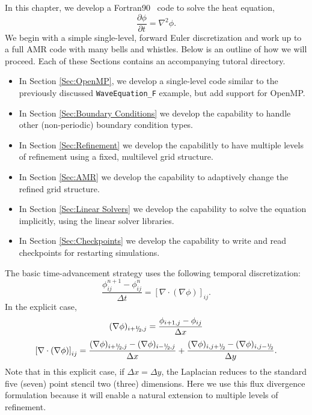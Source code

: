 In this chapter, we develop a Fortran90 \BoxLib\ code to solve the heat equation,
\begin{equation}
\frac{\partial\phi}{\partial t} = \nabla^2 \phi.
\end{equation}
We begin with a simple single-level, forward Euler discretization and work up to
a full AMR code with many bells and whistles.  Below is an outline of how we will 
proceed.  Each of these Sections contains an accompanying tutoral directory.

\begin{itemize}

\item In Section \ref{Sec:OpenMP}, we develop a single-level code similar to the
previously discussed {\tt WaveEquation\_F} example, but add support for OpenMP.

\item In Section \ref{Sec:Boundary Conditions} we develop the capability to handle
other (non-periodic) boundary condition types.

\item In Section \ref{Sec:Refinement} we develop the capabilitly to have multiple
levels of refinement using a fixed, multilevel grid structure.

\item In Section \ref{Sec:AMR} we develop the capability to adaptively change the
refined grid structure.

\item In Section \ref{Sec:Linear Solvers} we develop the capability to solve the
equation implicitly, using the linear solver libraries.

\item In Section \ref{Sec:Checkpoints} we develop the capability to write and read
checkpoints for restarting simulations.

\end{itemize}

The basic time-advancement strategy uses the following temporal discretization:
\begin{equation}
\frac{\phi_{ij}^{n+1} - \phi_{ij}^n}{\Delta t} = \left[\nabla\cdot(\nabla\phi)\right]_{ij}.
\end{equation}
In the explicit case,
\begin{equation}
(\nabla\phi)_{i+\myhalf,j} = \frac{\phi_{i+1,j}-\phi_{ij}}{\Delta x}
\end{equation}
\begin{equation}
\left[\nabla\cdot(\nabla\phi)\right]_{ij} = \frac{(\nabla\phi)_{i+\myhalf,j}-(\nabla\phi)_{i-\myhalf,j}}{\Delta x} + \frac{(\nabla\phi)_{i,j+\myhalf}-(\nabla\phi)_{i,j-\myhalf}}{\Delta y}.
\end{equation}
Note that in this explicit case, if $\Delta x = \Delta y$, the Laplacian reduces
to the standard five (seven) point stencil two (three) dimensions.  Here we use this flux 
divergence formulation because it will enable a natural extension to multiple levels of 
refinement.


